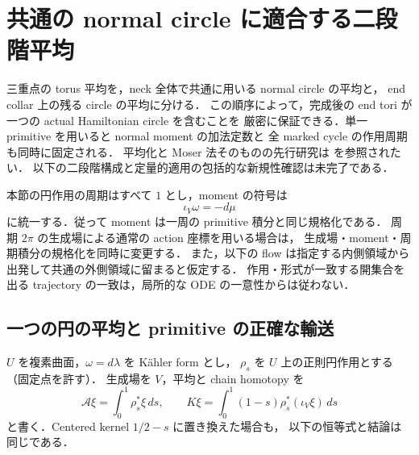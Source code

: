 \section{共通の normal circle に適合する二段階平均}
\label{ke:staged-neck-section}

三重点の torus 平均を，neck 全体で共通に用いる normal circle の平均と，
end collar 上の残る circle の平均に分ける．
この順序によって，完成後の end tori が一つの actual Hamiltonian circle を含むことを
厳密に保証できる．単一 primitive を用いると normal moment の加法定数と
全 marked cycle の作用周期も同時に固定される．
平均化と Moser 法そのものの先行研究は
\cite[Section~3]{RuanHMinimal}を参照されたい．
以下の二段階構成と定量的適用の包括的な新規性確認は未完了である．

本節の円作用の周期はすべて $1$ とし，moment の符号は
\[
 \iota_V\omega=-d\mu
\]
に統一する．従って moment は一周の primitive 積分と同じ規格化である．
周期 $2\pi$ の生成場による通常の action 座標を用いる場合は，
生成場・moment・周期積分の規格化を同時に変更する．
また，以下の flow は指定する内側領域から出発して共通の外側領域に留まると仮定する．
作用・形式が一致する開集合を出る trajectory の一致は，局所的な ODE の一意性からは従わない．

\subsection{一つの円の平均と primitive の正確な輸送}

$U$ を複素曲面，$\omega=d\lambda$ を K\"ahler form とし，
$\rho_s$ を $U$ 上の正則円作用とする（固定点を許す）．
生成場を $V$，平均と chain homotopy を
\[
 \mathcal A\xi=\int_0^1\rho_s^*\xi\,ds,\qquad
 K\xi=\int_0^1(1-s)\rho_s^*(\iota_V\xi)\,ds
\]
と書く．Centered kernel $1/2-s$ に置き換えた場合も，
以下の恒等式と結論は同じである．

